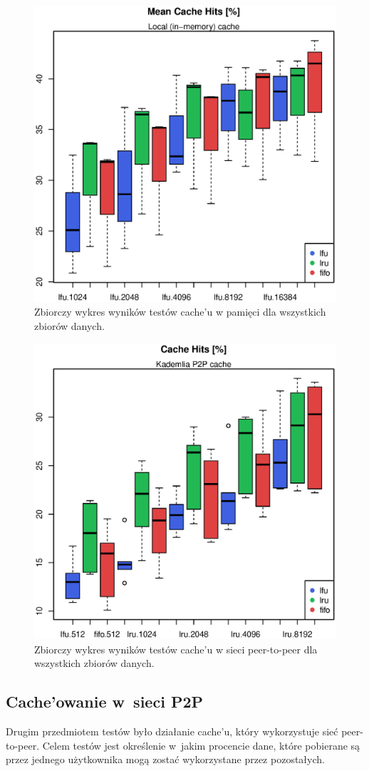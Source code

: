 \documentclass[a4paper,11pt]{scrartcl}
\newcommand{\s}{ }
\newcommand{\keszu}{cache'u}
\newcommand{\Keszowanie}{Cache'owanie}
\begin{document}
\begin{figure}[h!]
\centering
\includegraphics[width=0.6\linewidth]{img/tests/nop2p_all.eps}
\caption{Zbiorczy wykres wyników testów \keszu\s w pamięci dla wszystkich zbiorów danych.}
\label{fig_tests_mem_1}
\end{figure}

\begin{figure}[h!]
\centering
\includegraphics[width=0.6\linewidth]{img/tests/p2p_combined_all.eps}
\caption{Zbiorczy wykres wyników testów \keszu\s w sieci peer-to-peer dla wszystkich zbiorów danych.}
\label{fig_tests_p2p_all}
\end{figure}


\subsection{\Keszowanie\s w~sieci P2P}
Drugim przedmiotem testów było działanie \keszu, który wykorzystuje sieć peer-to-peer. Celem testów jest określenie w~jakim procencie dane, które pobierane są przez jednego użytkownika mogą zostać wykorzystane przez pozostałych.
\end{document}
